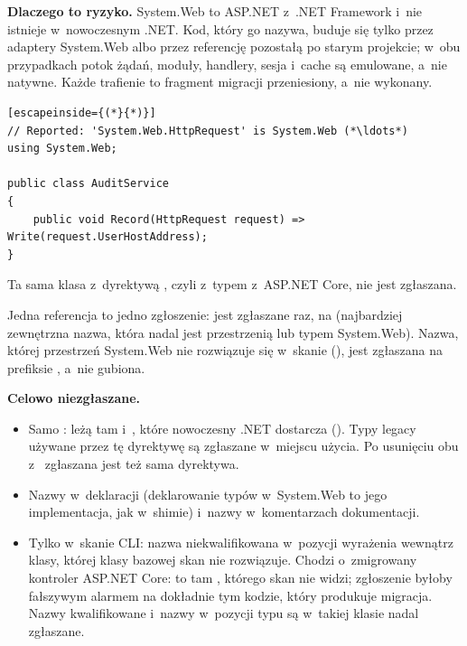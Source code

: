 \textbf{Dlaczego to ryzyko.} System.Web to ASP.NET z~.NET Framework i~nie istnieje
w~nowoczesnym .NET. Kod, który go nazywa, buduje się tylko przez adaptery System.Web albo
przez referencję pozostałą po starym projekcie; w~obu przypadkach potok żądań, moduły,
handlery, sesja i~cache są emulowane, a~nie natywne. Każde trafienie to fragment migracji
przeniesiony, a~nie wykonany.

\begin{lstlisting}[escapeinside={(*}{*)}]
// Reported: 'System.Web.HttpRequest' is System.Web (*\ldots*)
using System.Web;

public class AuditService
{
    public void Record(HttpRequest request) => Write(request.UserHostAddress);
}
\end{lstlisting}

Ta sama klasa z~dyrektywą , czyli z~typem
 z~ASP.NET Core, nie jest zgłaszana.

Jedna referencja to jedno zgłoszenie:  jest
zgłaszane raz, na  (najbardziej zewnętrzna nazwa, która
nadal jest przestrzenią lub typem System.Web). Nazwa, której przestrzeń System.Web nie
rozwiązuje się w~skanie (), jest zgłaszana na prefiksie
, a~nie gubiona.

\textbf{Celowo niezgłaszane.}
\begin{itemize}[leftmargin=*]
  \item Samo : leżą tam 
        i~, które nowoczesny .NET dostarcza
        (). Typy legacy używane przez tę dyrektywę są
        zgłaszane w~miejscu użycia. Po usunięciu obu z~
        zgłaszana jest też sama dyrektywa.
  \item Nazwy w~deklaracji  (deklarowanie typów w~System.Web to jego
        implementacja, jak w~shimie) i~nazwy w~komentarzach dokumentacji.
  \item Tylko w~skanie CLI: nazwa niekwalifikowana w~pozycji wyrażenia wewnątrz klasy,
        której klasy bazowej skan nie rozwiązuje. Chodzi o~zmigrowany kontroler ASP.NET Core:
         to tam , którego
        skan nie widzi; zgłoszenie byłoby fałszywym alarmem na dokładnie tym kodzie, który
        produkuje migracja. Nazwy kwalifikowane i~nazwy w~pozycji typu są w~takiej klasie
        nadal zgłaszane.
\end{itemize}

